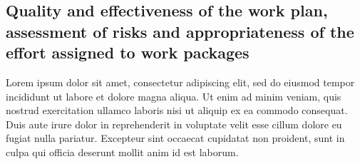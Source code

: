 
\subsection{Quality and effectiveness of the work plan, assessment of risks and appropriateness of the effort assigned to work packages}
\label{sec:implementationworkplan}

%
%
%
%






\noindent


Lorem ipsum dolor sit amet, consectetur adipiscing elit, sed do eiusmod tempor incididunt ut labore et dolore magna aliqua. Ut enim ad minim veniam, quis nostrud exercitation ullamco laboris nisi ut aliquip ex ea commodo consequat. Duis aute irure dolor in reprehenderit in voluptate velit esse cillum dolore eu fugiat nulla pariatur. Excepteur sint occaecat cupidatat non proident, sunt in culpa qui officia deserunt mollit anim id est laborum.

\newpage

